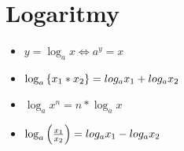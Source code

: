 \documentclass[main.tex]{subfiles}
\begin{document}
\section*{Logaritmy}
\begin{multicols}{2}
  \begin{itemize}
    \item $y=\log_a{x} \Leftrightarrow a^y = x$
    \item $\log_a{\{x_1*x_2\}}=\\
    log_a{x_1} + log_a{x_2}$
  \columnbreak
    \item $\log_a{x^n}=n*\log_a{x}$
    \item $\log_a{\left(\frac{x_1}{x_2}\right)}=\\
    log_a{x_1} - log_a{x_2}$
  \end{itemize}
\end{multicols}
\end{document}
